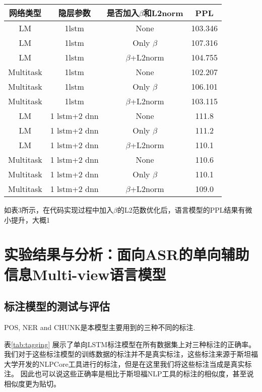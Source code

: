 \begin{table}[!hpb]
  \centering
   \begin{tabular}{ c| c  c | c}
            \hline
            网络类型 &
            隐层参数 &
            是否加入$\beta$和L2norm &
            PPL \\
           \hline
			LM&1lstm&None&103.346\\
			LM&1lstm&Only $\beta$&107.316\\
			LM&1lstm&$\beta$+L2norm&104.755\\
			Multitask&1lstm&None&102.207\\
			Multitask&1lstm&Only $\beta$&106.101\\
			Multitask&1lstm&$\beta$+L2norm&103.115\\
			LM&1 lstm+2 dnn&None&111.8\\
			LM&1 lstm+2 dnn&Only $\beta$&111.2\\
			LM&1 lstm+2 dnn&$\beta$+L2norm&110.1\\
			Multitask&1 lstm+2 dnn&None&110.6\\
			Multitask&1 lstm+2 dnn&Only $\beta$&110.1\\
			Multitask&1 lstm+2 dnn&$\beta$+L2norm&109.0\\
            \hline
          \end{tabular}
\end{table}
\footnotetext


如表3所示，在代码实现过程中加入$\beta$的L2范数优化后，语言模型的PPL结果有微小提升，大概1%




\section{实验结果与分析：面向ASR的单向辅助信息Multi-view语言模型}


\subsection{标注模型的测试与评估}

POS, NER and CHUNK是本模型主要用到的三种不同的标注.

表\ref{tab:tagging} 展示了单向LSTM标注模型在所有数据集上对三种标注的正确率。
我们对于这些标注模型的训练数据的标注并不是真实标注，这些标注来源于斯坦福大学开发的NLPCore工具进行的标注，但是在这里我们将这些标注当成是真实标注。
因此也可以说这些正确率是相比于斯坦福NLP工具的标注的相似度，甚至说相似度更为贴切。


